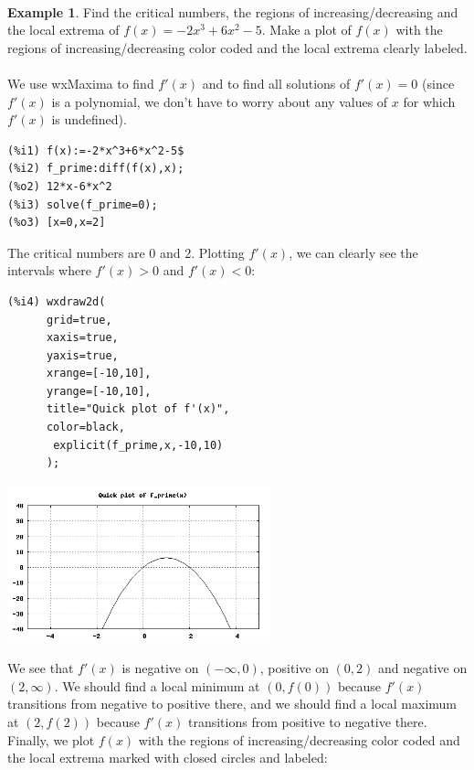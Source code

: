 \documentclass[10.5pt,twoside]{report}
\theoremstyle{definition}
\newtheorem{exmp}{Example}[section]
\begin{document}
${}$\\

\begin{exmp}

Find the critical numbers, the regions of increasing/decreasing and the local extrema of  $f(x)=-2x^3+6x^2-5$.  Make a plot of $f(x)$ with the regions of increasing/decreasing color coded and the local extrema clearly labeled.\\
${}$\\

We use wxMaxima to find $f'(x)$ and to find all solutions of $f'(x)=0$ (since $f'(x)$ is a polynomial, we don't have to worry about any values of $x$ for which $f'(x)$ is undefined).

\begin{verbatim}
(%i1) f(x):=-2*x^3+6*x^2-5$
(%i2) f_prime:diff(f(x),x);
(%o2) 12*x-6*x^2
(%i3) solve(f_prime=0);
(%o3) [x=0,x=2]
\end{verbatim}

The critical numbers are 0 and 2.  Plotting $f'(x)$, we can clearly see the intervals where $f'(x)>0$ and $f'(x)<0$:

\begin{verbatim}
(%i4) wxdraw2d(
      grid=true,
      xaxis=true,
      yaxis=true,
      xrange=[-10,10],
      yrange=[-10,10],
      title="Quick plot of f'(x)",
      color=black,
       explicit(f_prime,x,-10,10)
      );
\end{verbatim}

\includegraphics[width=3in]{example_5_1_1_1}

We see that $f'(x)$ is negative on $(-\infty,0)$, positive on $(0,2)$ and negative on $(2,\infty)$.  We should find a local minimum at $(0,f(0))$ because $f'(x)$ transitions from negative to positive there, and we should find a local maximum at $(2,f(2))$ because $f'(x)$ transitions from positive to negative there.  Finally, we plot $f(x)$ with the regions of increasing/decreasing color coded and the local extrema marked with closed circles and labeled:


\end{exmp}
\end{document}
